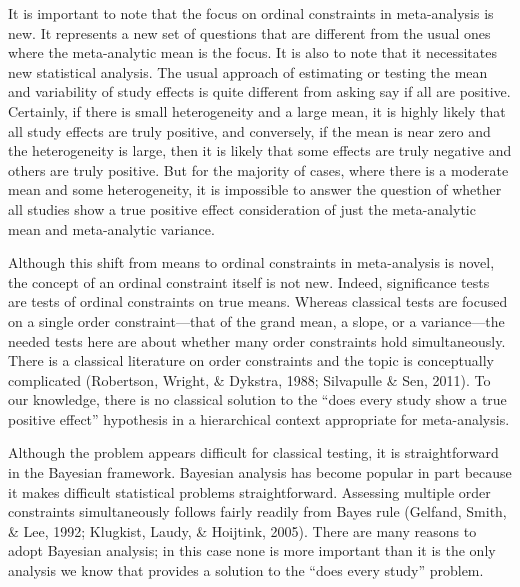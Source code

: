 \documentclass[english,man]{apa6}
\theoremstyle{definition}
\theoremstyle{definition}
\theoremstyle{remark}
\begin{document}
It is important to note that the focus on ordinal constraints in
meta-analysis is new. It represents a new set of questions that are
different from the usual ones where the meta-analytic mean is the focus.
It is also to note that it necessitates new statistical analysis. The
usual approach of estimating or testing the mean and variability of
study effects is quite different from asking say if all are positive.
Certainly, if there is small heterogeneity and a large mean, it is
highly likely that all study effects are truly positive, and conversely,
if the mean is near zero and the heterogeneity is large, then it is
likely that some effects are truly negative and others are truly
positive. But for the majority of cases, where there is a moderate mean
and some heterogeneity, it is impossible to answer the question of
whether all studies show a true positive effect consideration of just
the meta-analytic mean and meta-analytic variance.

Although this shift from means to ordinal constraints in meta-analysis
is novel, the concept of an ordinal constraint itself is not new.
Indeed, significance tests are tests of ordinal constraints on true
means. Whereas classical tests are focused on a single order
constraint---that of the grand mean, a slope, or a variance---the needed
tests here are about whether many order constraints hold simultaneously.
There is a classical literature on order constraints and the topic is
conceptually complicated (Robertson, Wright, \& Dykstra, 1988;
Silvapulle \& Sen, 2011). To our knowledge, there is no classical
solution to the \enquote{does every study show a true positive effect}
hypothesis in a hierarchical context appropriate for meta-analysis.

Although the problem appears difficult for classical testing, it is
straightforward in the Bayesian framework. Bayesian analysis has become
popular in part because it makes difficult statistical problems
straightforward. Assessing multiple order constraints simultaneously
follows fairly readily from Bayes rule (Gelfand, Smith, \& Lee, 1992;
Klugkist, Laudy, \& Hoijtink, 2005). There are many reasons to adopt
Bayesian analysis; in this case none is more important than it is the
only analysis we know that provides a solution to the \enquote{does
every study} problem.
\end{document}
